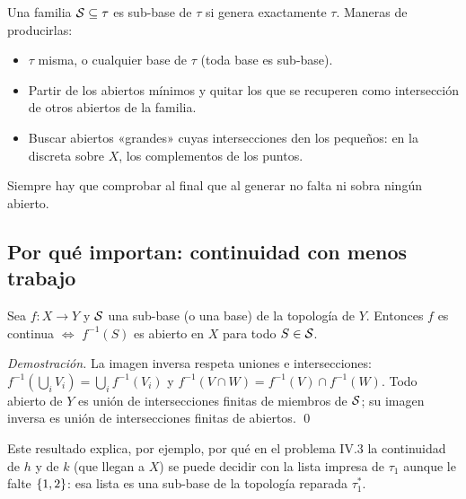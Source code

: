 \begin{metodo}
Una familia $\mathcal{S}\subseteq\tau$ es sub-base de $\tau$ si genera exactamente $\tau$. Maneras de producirlas:
\begin{itemize}
\item $\tau$ misma, o cualquier base de $\tau$ (toda base es sub-base).
\item Partir de los abiertos mínimos y quitar los que se recuperen como intersección de otros abiertos de la familia.
\item Buscar abiertos «grandes» cuyas intersecciones den los pequeños: en la discreta sobre $X$, los complementos de
los puntos.
\end{itemize}
Siempre hay que comprobar al final que al generar no falta ni sobra ningún abierto.
\end{metodo}

\subsection{Por qué importan: continuidad con menos trabajo}
\begin{teorema}
Sea $f:X\to Y$ y $\mathcal{S}$ una sub-base (o una base) de la topología de $Y$. Entonces $f$ es continua $\iff$
$f^{-1}(S)$ es abierto en $X$ para todo $S\in\mathcal{S}$.
\end{teorema}
\emph{Demostración.} La imagen inversa respeta uniones e intersecciones:
$f^{-1}(\bigcup_iV_i)=\bigcup_if^{-1}(V_i)$ y $f^{-1}(V\cap W)=f^{-1}(V)\cap f^{-1}(W)$. Todo abierto de $Y$ es unión
de intersecciones finitas de miembros de $\mathcal{S}$; su imagen inversa es unión de intersecciones finitas de abiertos. \qed

Este resultado explica, por ejemplo, por qué en el problema IV.3 la continuidad de $h$ y de $k$ (que llegan a $X$)
se puede decidir con la lista impresa de $\tau_1$ aunque le falte $\{1,2\}$: esa lista es una sub-base de la topología
reparada $\tau_1^{*}$.
